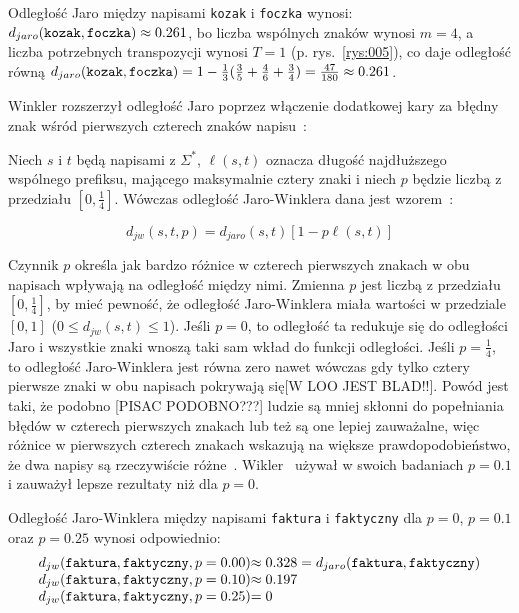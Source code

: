 \documentclass{praca1}
\begin{document}
\begin{example}
Odległość Jaro między napisami \verb|kozak| i \verb|foczka| wynosi: $d_{jaro}(\verb|kozak|, \verb|foczka|)  \approx 0.261$, bo liczba wspólnych znaków wynosi $m = 4$, a liczba potrzebnych transpozycji wynosi $T = 1$ (p. rys.~\ref{rys:005}), co daje odległość równą $d_{jaro}(\verb|kozak|, \verb|foczka|) = 1 - \frac{1}{3}(\frac{3}{5} + \frac{4}{6} + \frac{3}{4}) = \frac{47}{180} \approx 0.261$.
\end{example}

Winkler rozszerzył odległość Jaro poprzez włączenie dodatkowej kary za błędny znak wśród pierwszych czterech znaków napisu~\cite{Loo2014:stringdist}:

\begin{definition}
Niech $s$ i $t$ będą napisami z $\Sigma^*$, $\ell(s,t)$ oznacza długość najdłuższego wspólnego prefiksu, mającego maksymalnie cztery znaki i niech $p$ będzie liczbą z przedziału $[0, \frac{1}{4}]$. Wówczas odległość Jaro-Winklera dana jest wzorem~\cite{Winkler1990:stringcomparator}:

\begin{equation}
\label{eq:012}
d_{jw}(s,t, p) = d_{jaro}(s,t)[1 - p\ell(s,t)]
\end{equation}
\end{definition}

Czynnik $p$ określa jak bardzo różnice w czterech pierwszych znakach w obu napisach wpływają na odległość między nimi. Zmienna $p$ jest liczbą z przedziału $[0, \frac{1}{4}]$, by mieć pewność, że odległość Jaro-Winklera miała wartości w przedziale $[0,1]$ ($0 \leq d_{jw}(s,t) \leq 1$). Jeśli $p=0$, to odległość ta redukuje się do odległości Jaro i wszystkie znaki wnoszą taki sam wkład do funkcji odległości. Jeśli $p = \frac{1}{4}$, to odległość Jaro-Winklera jest równa zero nawet wówczas gdy tylko cztery pierwsze znaki w obu napisach pokrywają się[W LOO JEST BLAD!!]. Powód jest taki, że podobno [PISAC PODOBNO???] ludzie są mniej skłonni do popełniania błędów w czterech pierwszych znakach lub też są one lepiej zauważalne, więc różnice w pierwszych czterech znakach wskazują na większe prawdopodobieństwo, że dwa napisy są rzeczywiście różne~\cite{Loo2014:stringdist}. Wikler~\cite{Winkler1990:stringcomparator} używał w swoich badaniach $p = 0.1$ i zauważył lepsze rezultaty niż dla $p = 0$.

\begin{example}
Odległość Jaro-Winklera między napisami \verb|faktura| i \verb|faktyczny| dla $p = 0$, $p = 0.1$ oraz $p = 0.25$ wynosi odpowiednio: 
\begin{equation*}
  \left.\begin{array}{l@{}l}
    d_{jw}(\verb|faktura|, \verb|faktyczny|, p = 0.00) & \approx 0.328 = d_{jaro}(\verb|faktura|, \verb|faktyczny|) \\
    d_{jw}(\verb|faktura|, \verb|faktyczny|, p = 0.10) & \approx 0.197  \\
    d_{jw}(\verb|faktura|, \verb|faktyczny|, p = 0.25) & =  0
  \end{array}\right.
\end{equation*}
\end{example}
\end{document}
